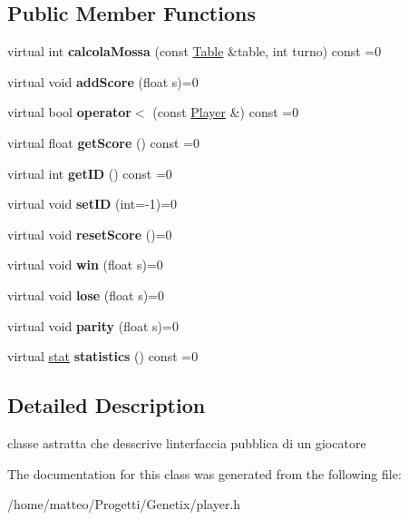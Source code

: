 \subsection*{Public Member Functions}
\begin{DoxyCompactItemize}
\item 
\mbox{\label{classPlayer_a444eb8f2a19debbee8d6dd4a48d846c2}} 
virtual int {\bfseries calcola\+Mossa} (const \hyperlink{classTable}{Table} \&table, int turno) const =0
\item 
\mbox{\label{classPlayer_a776326d11b142ce77092f4ebc8f6e6ad}} 
virtual void {\bfseries add\+Score} (float s)=0
\item 
\mbox{\label{classPlayer_aca94f2f4dd3e054c539ecb4c0ac3acda}} 
virtual bool {\bfseries operator$<$} (const \hyperlink{classPlayer}{Player} \&) const =0
\item 
\mbox{\label{classPlayer_a9c5101d60d359563262426240fdd31c0}} 
virtual float {\bfseries get\+Score} () const =0
\item 
\mbox{\label{classPlayer_ab8cde15b9f6f3a8c32f310e0ea3e3ae3}} 
virtual int {\bfseries get\+ID} () const =0
\item 
\mbox{\label{classPlayer_a8a055205512ac51a6bf1b3159000ac7f}} 
virtual void {\bfseries set\+ID} (int=-\/1)=0
\item 
\mbox{\label{classPlayer_a3bef660a18e4a1366235235b342394ef}} 
virtual void {\bfseries reset\+Score} ()=0
\item 
\mbox{\label{classPlayer_aad827fcb0d6d140f5188aae38dd95c59}} 
virtual void {\bfseries win} (float s)=0
\item 
\mbox{\label{classPlayer_a0a3d28e44143a56af896aaa426f9bd30}} 
virtual void {\bfseries lose} (float s)=0
\item 
\mbox{\label{classPlayer_a2f3a54c4f93737823789b6072a5dfc45}} 
virtual void {\bfseries parity} (float s)=0
\item 
\mbox{\label{classPlayer_a455902b4c74ae9e63cc86d941bbd2f76}} 
virtual \hyperlink{structstat}{stat} {\bfseries statistics} () const =0
\end{DoxyCompactItemize}


\subsection{Detailed Description}
classe astratta che desscrive l\textquotesingle{}interfaccia pubblica di un giocatore 

The documentation for this class was generated from the following file\+:\begin{DoxyCompactItemize}
\item 
/home/matteo/\+Progetti/\+Genetix/player.\+h\end{DoxyCompactItemize}
